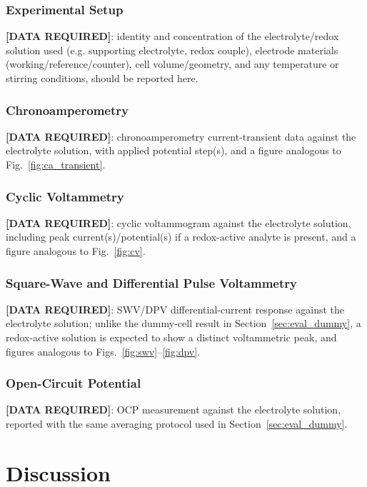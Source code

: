 \documentclass[preprint,12pt]{elsarticle}
\begin{document}
\subsubsection{Experimental Setup}
\textbf{[DATA REQUIRED]}: identity and concentration of the electrolyte/redox solution used (e.g. supporting electrolyte, redox couple), electrode materials (working/reference/counter), cell volume/geometry, and any temperature or stirring conditions, should be reported here.

\subsubsection{Chronoamperometry}
\textbf{[DATA REQUIRED]}: chronoamperometry current-transient data against the electrolyte solution, with applied potential step(s), and a figure analogous to Fig.~\ref{fig:ca_transient}.

\subsubsection{Cyclic Voltammetry}
\textbf{[DATA REQUIRED]}: cyclic voltammogram against the electrolyte solution, including peak current(s)/potential(s) if a redox-active analyte is present, and a figure analogous to Fig.~\ref{fig:cv}.

\subsubsection{Square-Wave and Differential Pulse Voltammetry}
\textbf{[DATA REQUIRED]}: SWV/DPV differential-current response against the electrolyte solution; unlike the dummy-cell result in Section~\ref{sec:eval_dummy}, a redox-active solution is expected to show a distinct voltammetric peak, and figures analogous to Figs.~\ref{fig:swv}--\ref{fig:dpv}.

\subsubsection{Open-Circuit Potential}
\textbf{[DATA REQUIRED]}: OCP measurement against the electrolyte solution, reported with the same averaging protocol used in Section~\ref{sec:eval_dummy}.

\section{Discussion}
\end{document}
